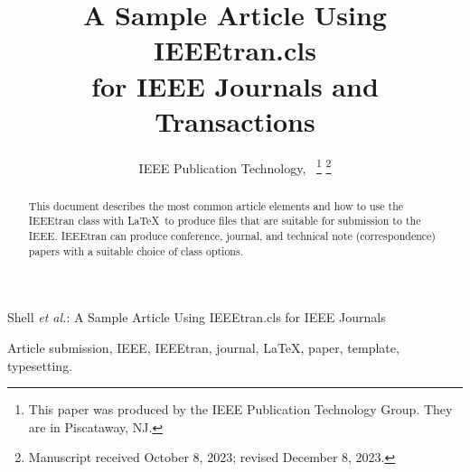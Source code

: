 \documentclass[letterpaper,journal]{IEEEtran}
\begin{document}
\title{A Sample Article Using IEEEtran.cls\\ for IEEE Journals and Transactions}

\author{IEEE Publication Technology,~
  \thanks{This paper was produced by the IEEE Publication Technology Group. They are in Piscataway, NJ.}%
  \thanks{Manuscript received October 8, 2023; revised December 8, 2023.}}

%
{Shell \MakeLowercase{\textit{et al.}}: A Sample Article Using IEEEtran.cls for IEEE Journals}


\maketitle

\begin{abstract}
  This document describes the most common article elements and how to use the IEEEtran class with \LaTeX \ to produce files that are suitable for submission to the IEEE.  IEEEtran can produce conference, journal, and technical note (correspondence) papers with a suitable choice of class options.
\end{abstract}











\begin{IEEEkeywords}
  Article submission, IEEE, IEEEtran, journal, \LaTeX, paper, template, typesetting.
\end{IEEEkeywords}









% 

% 
\end{document}
